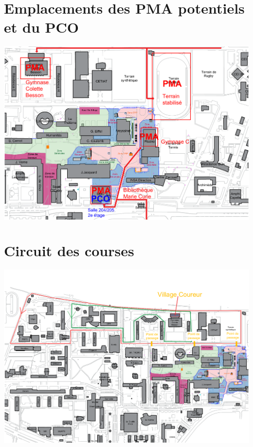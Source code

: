 \documentclass[hidelinks, paper=a4, fontsize=13pt]{report}
\begin{document}
\section{Emplacements des PMA potentiels et du PCO}
	\begin{center}\includegraphics[width=.95\textheight,angle=90]{Exports/Plan_24h_45eme-PCO_PMA}\end{center}


\section{Circuit des courses}
	\begin{center}\includegraphics[width=.95\textheight, angle=90]{Exports/Plan_24h_45eme-Parcours_courses}\end{center}
\end{document}
